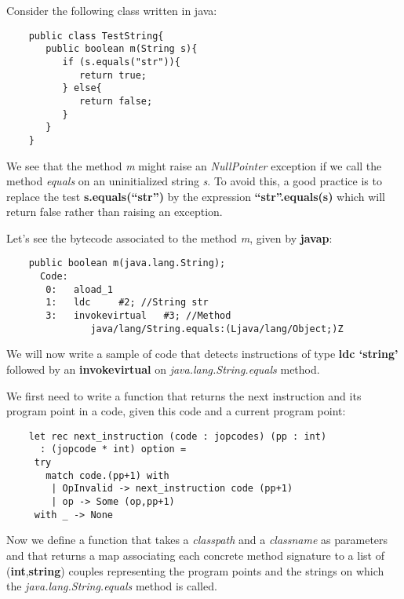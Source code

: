 \documentclass{article}
\begin{document}
Consider the following class written in java:

\begin{verbatim}
    public class TestString{
       public boolean m(String s){
          if (s.equals("str")){
             return true;
          } else{
             return false;
          }
       }
    }
\end{verbatim}
We see that the method \emph{m} might raise an \emph{NullPointer}
exception if we call the method \emph{equals} on an uninitialized
string \emph{s}. To avoid this, a good practice is to replace the
test \textbf{s.equals(``str'')} by the expression
\textbf{``str''.equals(s)} which will return false rather than
raising an exception.

Let's see the bytecode associated to the method \emph{m}, given by
\textbf{javap}:

\begin{verbatim}
    public boolean m(java.lang.String);
      Code:
       0:   aload_1
       1:   ldc     #2; //String str
       3:   invokevirtual   #3; //Method
               java/lang/String.equals:(Ljava/lang/Object;)Z
\end{verbatim}
We will now write a sample of code that detects instructions of
type \textbf{ldc `string'} followed by an \textbf{invokevirtual} on
\emph{java.lang.String.equals} method.

We first need to write a function that returns the next instruction
and its program point in a code, given this code and a current
program point:

\begin{verbatim}
    let rec next_instruction (code : jopcodes) (pp : int)
      : (jopcode * int) option =
     try
       match code.(pp+1) with
        | OpInvalid -> next_instruction code (pp+1)
        | op -> Some (op,pp+1)
     with _ -> None
\end{verbatim}
Now we define a function that takes a \emph{classpath} and a
\emph{classname} as parameters and that returns a map associating
each concrete method signature to a list of
(\textbf{int},\textbf{string}) couples representing the program
points and the strings on which the \emph{java.lang.String.equals}
method is called.
\end{document}
